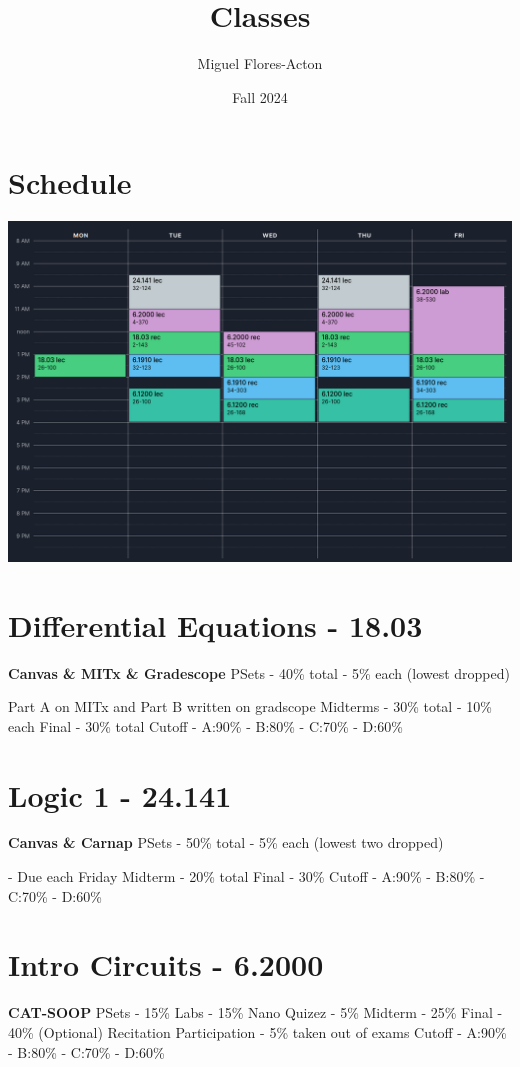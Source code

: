 \documentclass{article}
\title{Classes}
\author{Miguel Flores-Acton}
\date{Fall 2024}
\begin{document}
\maketitle

\section{Schedule}
\includegraphics[width=1\textwidth]{image.png}

\section{Differential Equations - 18.03}
\textbf{Canvas \& MITx \& Gradescope}
 PSets - 40\% total - 5\% each (lowest dropped)

Part A on MITx and Part B written on gradscope
 Midterms - 30\% total - 10\% each
\newline
Final - 30\% total
\newline
Cutoff - A:90\% - B:80\% - C:70\% - D:60\%
\section{Logic 1 - 24.141}
\textbf{Canvas \& Carnap}
 PSets - 50\% total - 5\% each (lowest two dropped)

- Due each Friday
\newline
Midterm - 20\% total
\newline
Final - 30\%
\newline
Cutoff - A:90\% - B:80\% - C:70\% - D:60\%
\section{Intro Circuits - 6.2000}
\textbf{CAT-SOOP}
PSets - 15\%
\newline
Labs - 15\%
\newline
Nano Quizez - 5\%
\newline
Midterm - 25\%
\newline
Final - 40\%
\newline
(Optional) Recitation Participation - 5\% taken out of exams
\newline
Cutoff - A:90\% - B:80\% - C:70\% - D:60\%
\end{document}
